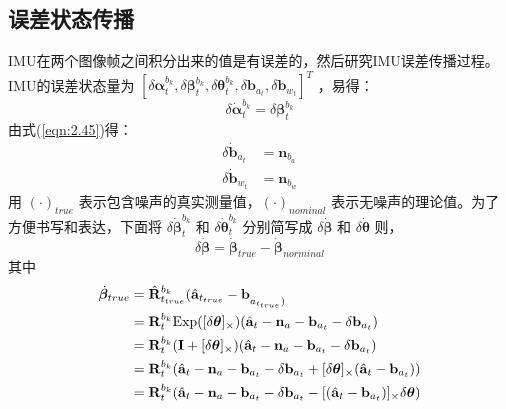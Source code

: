 \subsection{误差状态传播}
\label{chap:3.2.3}
IMU在两个图像帧之间积分出来的值是有误差的，然后研究IMU误差传播过程。IMU的误差状态量为 $[ \delta{\bm{\alpha}}_t^{b_k},\delta{\bm{\beta}}_t^{b_k},
\delta{\bm{\theta}}_t^{b_k} ,\delta{\mathbf{b}}_{a_t} ,\delta{\mathbf{b}}_{w_t} ] ^T$ ，易得：
\begin{equation}
\label{eqn:3.21}
\delta \dot{\bm{\alpha}}_t^{b_k} = \delta \bm{\beta}_t^{b_k}
\end{equation}
由式(\ref{eqn:2.45})得：
\begin{equation}
\label{eqn:3.22}
\begin{aligned}
\delta \dot{\mathbf{b}}_{a_t} &= \mathbf{n}_{b_a} \\
\delta \dot{\mathbf{b}}_{w_t} &= \mathbf{n}_{b_w}
\end{aligned}
\end{equation}
用 $(\cdot)_{true} $ 表示包含噪声的真实测量值，$(\cdot)_{nominal} $ 表示无噪声的理论值。为了方便书写和表达，下面将 $\delta \dot{\bm{\beta}}_t^{b_k}  $ 和 $\delta \dot{\bm{\theta}}_t^{b_k}  $ 分别简写成 $\delta \dot{\bm{\beta}} $ 和 $\delta \dot{\bm{\theta}} $ 则，
\begin{equation}
\label{eqn:3.23}
\delta \dot{\bm{\beta}} = \dot{\bm{\beta}}_{true} - \dot{\bm{\beta}}_{norminal}
\end{equation}
其中
\begin{equation}
\label{eqn:3.24}
\begin{aligned}
\dot{\bm{\beta}}_{true} &= \hat{\mathbf{R}}_{t_{true}}^{b_k} ( \hat{\mathbf{a}}_{t_{true}} - \mathbf{b}}_{a_{t_{true}}) \\
&= \mathbf{R}_t^{b_k} \text{Exp}( [\delta \bm{\theta}]_{\times} ) ( \hat{\mathbf{a}}_t - \mathbf{n}_a - \mathbf{b}_{a_t} - \delta\mathbf{b}_{a_t} ) \\
&= \mathbf{R}_t^{b_k} (\mathbf{I}+[\delta \bm{\theta}]_{\times} )(\hat{\mathbf{a}}_t - \mathbf{n}_a - \mathbf{b}_{a_t} - \delta\mathbf{b}_{a_t}  ) \\
&= \mathbf{R}_t^{b_k} ( \hat{\mathbf{a}}_t - \mathbf{n}_a - \mathbf{b}_{a_t} - \delta\mathbf{b}_{a_t} + [\delta \bm{\theta}]_{\times} (\hat{\mathbf{a}}_t - \mathbf{b}_{a_t} )) \\
&= \mathbf{R}_t^{b_k} ( \hat{\mathbf{a}}_t - \mathbf{n}_a - \mathbf{b}_{a_t} - \delta\mathbf{b}_{a_t} - [(\hat{\mathbf{a}}_t - \mathbf{b}_{a_t}) ]_{\times} \delta \bm{\theta} ) 
\end{aligned}
\end{equation}
